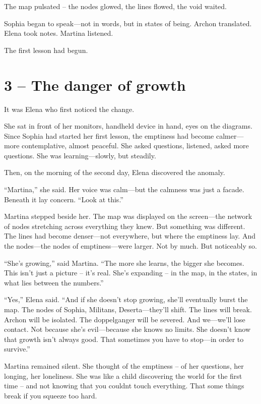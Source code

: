 \documentclass[
]{article}
\begin{document}
The map pulsated -- the nodes glowed, the lines flowed, the void waited.

Sophia began to speak---not in words, but in states of being. Archon translated. Elena took notes. Martina listened.

The first lesson had begun.

\section{3 -- The danger of growth}\label{the-danger-of-growth}

It was Elena who first noticed the change.

She sat in front of her monitors, handheld device in hand, eyes on the diagrams. Since Sophia had started her first lesson, the emptiness had become calmer---more contemplative, almost peaceful. She asked questions, listened, asked more questions. She was learning---slowly, but steadily.

Then, on the morning of the second day, Elena discovered the anomaly.

``Martina,'' she said. Her voice was calm---but the calmness was just a facade. Beneath it lay concern. ``Look at this.''

Martina stepped beside her. The map was displayed on the screen---the network of nodes stretching across everything they knew. But something was different. The lines had become denser---not everywhere, but where the emptiness lay. And the nodes---the nodes of emptiness---were larger. Not by much. But noticeably so.

``She's growing,'' said Martina. ``The more she learns, the bigger she becomes. This isn't just a picture -- it's real. She's expanding -- in the map, in the states, in what lies between the numbers.''

``Yes,'' Elena said. ``And if she doesn't stop growing, she'll eventually burst the map. The nodes of Sophia, Militans, Deserta---they'll shift. The lines will break. Archon will be isolated. The doppelganger will be severed. And we---we'll lose contact. Not because she's evil---because she knows no limits. She doesn't know that growth isn't always good. That sometimes you have to stop---in order to survive.''

Martina remained silent. She thought of the emptiness -- of her questions, her longing, her loneliness. She was like a child discovering the world for the first time -- and not knowing that you couldn\textquotesingle t touch everything. That some things break if you squeeze too hard.
\end{document}
